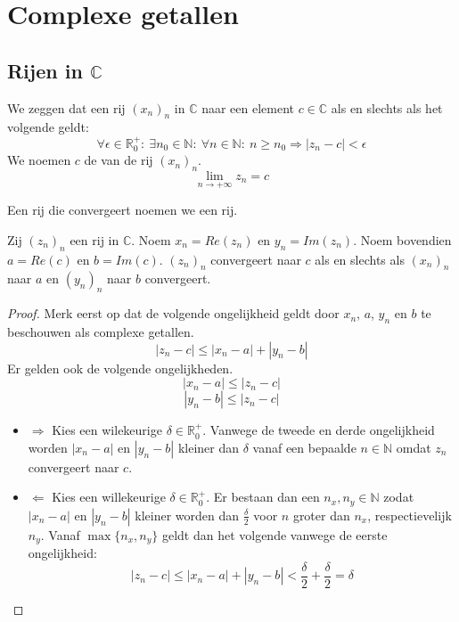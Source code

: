 \documentclass[main.tex]{subfiles}
\begin{document}
\section{Complexe getallen}
\label{sec:de-complexe-getallen}

\subsection{Rijen in $\mathbb{C}$}
\label{sec:rijen-mathbbc}

\begin{de}
  We zeggen dat een rij $(x_{n})_{n}$ in $\mathbb{C}$  naar een element $c\in \mathbb{C}$ als en slechts als het volgende geldt:
  \[ \forall \epsilon \in \mathbb{R}_{0}^{+}:\ \exists n_{0}\in \mathbb{N}:\ \forall n\in \mathbb{N}:\ n \ge n_{0} \Rightarrow |z_{n}-c| < \epsilon \]
  We noemen $c$ de  van de rij $(x_{n})_{n}$.
  \[ \lim_{n\rightarrow +\infty}z_{n} = c \]
\end{de}

\begin{de}
  Een rij die convergeert noemen we een  rij.
\end{de}

\begin{pr}
  \label{pr:complexe-limiet-splitsen}
  Zij $(z_{n})_{n}$ een rij in $\mathbb{C}$.
  Noem $x_{n} = Re(z_{n})$ en $y_{n} = Im(z_{n})$.
  Noem bovendien $a=Re(c)$ en $b=Im(c)$.
  $(z_{n})_{n}$ convergeert naar $c$ als en slechts als $(x_{n})_{n}$ naar $a$ en $(y_{n})_{n}$ naar $b$ convergeert.

  \begin{proof}
    Merk eerst op dat de volgende ongelijkheid geldt door $x_{n}$, $a$, $y_{n}$ en $b$ te beschouwen als complexe getallen.
    \[ |z_{n}-c| \le |x_{n}-a| + |y_{n}-b| \]
    Er gelden ook de volgende ongelijkheden.
    \[ |x_{n}-a| \le |z_{n}-c| \]
    \[ |y_{n}-b| \le |z_{n}-c| \]
    \begin{itemize}
    \item $\Rightarrow$
      Kies een wilekeurige $\delta \in \mathbb{R}_{0}^{+}$.
      Vanwege de tweede en derde ongelijkheid worden $|x_{n}-a|$ en $|y_{n}-b|$ kleiner dan $\delta$ vanaf een bepaalde $n\in \mathbb{N}$ omdat $z_{n}$ convergeert naar $c$.
    \item $\Leftarrow$
      Kies een willekeurige $\delta \in \mathbb{R}_{0}^{+}$.
      Er bestaan dan een $n_{x},n_{y}\in \mathbb{N}$ zodat $|x_{n}-a|$ en $|y_{n}-b|$ kleiner worden dan $\frac{\delta}{2}$ voor $n$ groter dan $n_{x}$, respectievelijk $n_{y}$.
      Vanaf $\max\{n_{x},n_{y}\}$ geldt dan het volgende vanwege de eerste ongelijkheid:
      \[ |z_{n}-c| \le |x_{n}-a| + |y_{n}-b| < \frac{\delta}{2}+\frac{\delta}{2} = \delta \]
    \end{itemize}
  \end{proof}
\end{pr}
\end{document}
